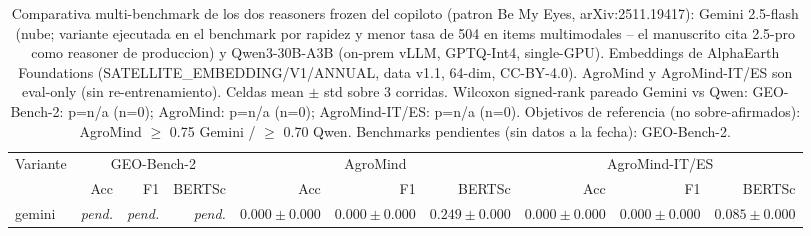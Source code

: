 \begin{table}[t]
\centering
\caption{Comparativa multi-benchmark de los dos reasoners frozen del copiloto (patron Be My Eyes, arXiv:2511.19417): Gemini 2.5-flash (nube; variante ejecutada en el benchmark por rapidez y menor tasa de 504 en items multimodales -- el manuscrito cita 2.5-pro como reasoner de produccion) y Qwen3-30B-A3B (on-prem vLLM, GPTQ-Int4, single-GPU). Embeddings de AlphaEarth Foundations (SATELLITE\_EMBEDDING/V1/ANNUAL, data v1.1, 64-dim, CC-BY-4.0). AgroMind y AgroMind-IT/ES son eval-only (sin re-entrenamiento). Celdas mean $\pm$ std sobre 3 corridas. Wilcoxon signed-rank pareado Gemini vs Qwen: GEO-Bench-2: p=n/a (n=0); AgroMind: p=n/a (n=0); AgroMind-IT/ES: p=n/a (n=0). Objetivos de referencia (no sobre-afirmados): AgroMind $\geq$ 0.75 Gemini / $\geq$ 0.70 Qwen. Benchmarks pendientes (sin datos a la fecha): GEO-Bench-2.}
\label{tab:paper-benchmark-comparison}
\begin{tabular}{lrrrrrrrrr}
\toprule
Variante & \multicolumn{3}{c}{GEO-Bench-2} & \multicolumn{3}{c}{AgroMind} & \multicolumn{3}{c}{AgroMind-IT/ES} \\
\cmidrule(lr){2-10}
 & Acc & F1 & BERTSc & Acc & F1 & BERTSc & Acc & F1 & BERTSc \\
\midrule
gemini & \textit{pend.} & \textit{pend.} & \textit{pend.} & $0.000 \pm 0.000$ & $0.000 \pm 0.000$ & $0.249 \pm 0.000$ & $0.000 \pm 0.000$ & $0.000 \pm 0.000$ & $0.085 \pm 0.000$ \\
\bottomrule
\end{tabular}
\end{table}
